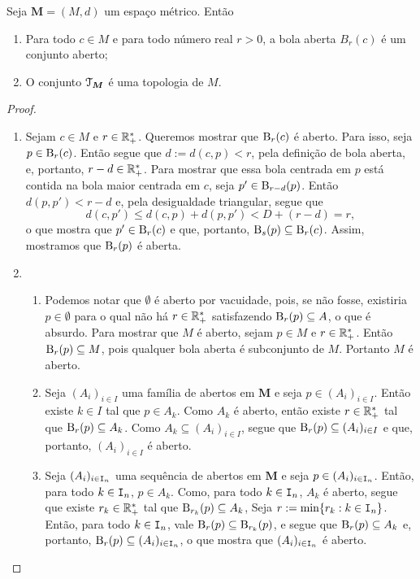 \begin{prop}
Seja $\bm M = (M,d)$ um espaço métrico. Então
	\begin{enumerate}
	\item Para todo $c \in M$ e para todo número real $r > 0$, a bola aberta $B_r(c)$ é um conjunto aberto;
	\item O conjunto $\mathcal{T}_{\bm M}$ é uma topologia de $M$.
	\end{enumerate}
\end{prop}
\begin{proof}
	\begin{enumerate}
	\item Sejam $c \in M$ e $r \in \mathbb{R}_+^*$. Queremos mostrar que $\mathrm{B}_r(c)$ é aberto. Para isso, seja $p \in \mathrm{B}_r(c)$. Então segue que $d := d(c,p) < r$, pela definição de bola aberta, e, portanto, $r-d \in \mathbb{R}_+^*$. Para mostrar que essa bola centrada em $p$ está contida na bola maior centrada em $c$, seja $p' \in \mathrm{B}_{r-d}(p)$. Então $d(p,p')<r-d$ e, pela desigualdade triangular, segue que
	\begin{equation*}
	d(c,p') \leq d(c,p) + d(p,p') < D + (r-d) = r,
	\end{equation*}
o que mostra que $p' \in \mathrm{B}_r(c)$ e que, portanto, $\mathrm{B}_s(p) \subseteq \mathrm{B}_r(c)$. Assim, mostramos que $\mathrm{B}_r(p)$ é aberta.
	
	\item
		\begin{enumerate}
		\item Podemos notar que $\emptyset$ é aberto por vacuidade, pois, se não fosse, existiria $p \in \emptyset$ para o qual não há $r \in \mathbb{R}_+^*$ satisfazendo $\mathrm{B}_r(p) \subseteq A$, o que é absurdo.
	Para mostrar que $M$ é aberto, sejam $p \in M$ e $r \in \mathbb{R}_+^*$. Então $\mathrm{B}_r(p) \subseteq M$, pois qualquer bola aberta é subconjunto de $M$. Portanto $M$ é aberto.
	
		\item Seja $(A_i)_{i \in I}$ uma família de abertos em $\bm M$ e seja $p \in (A_i)_{i \in I}$. Então existe $k \in I$ tal que $p \in A_k$. Como $A_k$ é aberto, então existe $r \in \mathbb{R}_+^*$ tal que $\mathrm{B}_r(p) \subseteq A_k$. Como $A_k \subseteq (A_i)_{i \in I}$, segue que $\mathrm{B}_r(p) \subseteq (A_i)_{i \in I}$ e que, portanto, $(A_i)_{i \in I}$ é aberto.
	
		\item Seja $(A_i)_{i \in \mathtt I_n}$ uma sequência de abertos em $\bm M$ e seja $p \in (A_i)_{i \in \mathtt I_n}$. Então, para todo $k \in \mathtt I_n$, $p \in A_k$. Como, para todo $k \in \mathtt I_n$, $A_k$ é aberto, segue que existe $r_k \in \mathbb{R}_+^*$ tal que $\mathrm{B}_{r_k}(p) \subseteq A_k$, Seja $r := \min \{r_k : k \in \mathtt I_n\}$. Então, para todo $k \in \mathtt I_n$, vale $\mathrm{B}_r(p) \subseteq \mathrm{B}_{r_k}(p)$, e segue que $\mathrm{B}_r(p) \subseteq A_k$ e, portanto, $\mathrm{B}_r(p) \subseteq (A_i)_{i \in \mathtt I_n}$, o que mostra que $(A_i)_{i \in \mathtt I_n}$ é aberto.
		\end{enumerate}		
	\end{enumerate}
\end{proof}

